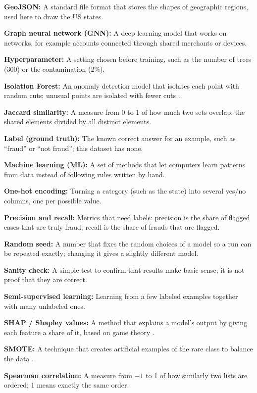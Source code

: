 \textbf{GeoJSON:} A standard file format that stores the shapes of geographic regions, used here to draw the US states.

\textbf{Graph neural network (GNN):} A deep learning model that works on networks, for example accounts connected through shared merchants or devices.

\textbf{Hyperparameter:} A setting chosen before training, such as the number of trees (300) or the contamination (2\%).

\textbf{Isolation Forest:} An anomaly detection model that isolates each point with random cuts; unusual points are isolated with fewer cuts \cite{liu2008isolation}.

\textbf{Jaccard similarity:} A measure from 0 to 1 of how much two sets overlap: the shared elements divided by all distinct elements.

\textbf{Label (ground truth):} The known correct answer for an example, such as ``fraud'' or ``not fraud''; this dataset has none.

\textbf{Machine learning (ML):} A set of methods that let computers learn patterns from data instead of following rules written by hand.

\textbf{One-hot encoding:} Turning a category (such as the state) into several yes/no columns, one per possible value.

\textbf{Precision and recall:} Metrics that need labels: precision is the share of flagged cases that are truly fraud; recall is the share of frauds that are flagged.

\textbf{Random seed:} A number that fixes the random choices of a model so a run can be repeated exactly; changing it gives a slightly different model.

\textbf{Sanity check:} A simple test to confirm that results make basic sense; it is not proof that they are correct.

\textbf{Semi-supervised learning:} Learning from a few labeled examples together with many unlabeled ones.

\textbf{SHAP / Shapley values:} A method that explains a model's output by giving each feature a share of it, based on game theory \cite{lundberg2017unified}.

\textbf{SMOTE:} A technique that creates artificial examples of the rare class to balance the data \cite{chawla2002smote}.

\textbf{Spearman correlation:} A measure from $-1$ to 1 of how similarly two lists are ordered; 1 means exactly the same order.

